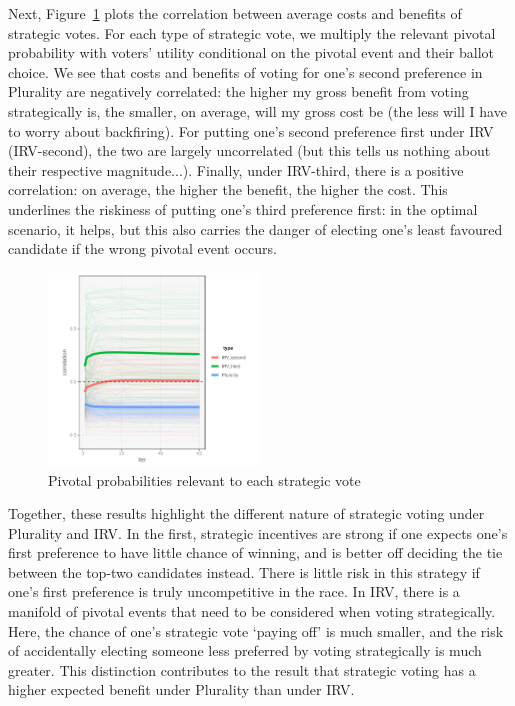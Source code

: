 \documentclass[12pt, letter]{article}
\begin{document}
Next, Figure~\ref{fig:correl} plots the correlation between average costs and benefits of strategic votes. For each type of strategic vote, we multiply the relevant pivotal probability with voters' utility conditional on the pivotal event and their ballot choice. We see that costs and benefits of voting for one's second preference in Plurality are negatively correlated: the higher my gross benefit from voting strategically is, the smaller, on average, will my gross cost be (the less will I have to worry about backfiring). For putting one's second preference first under IRV (IRV-second), the two are largely uncorrelated (but this tells us nothing about their respective magnitude...). Finally, under IRV-third, there is a positive correlation: on average, the higher the benefit, the higher the cost. This underlines the riskiness of putting one's third preference first: in the optimal scenario, it helps, but this also carries the danger of electing one's least favoured candidate if the wrong pivotal event occurs.

\begin{figure}[!htb]
	\centering
	\includegraphics[width = 0.5\textwidth]{../output/figures/conj2}
	\caption{Pivotal probabilities relevant to each strategic vote}
	\label{fig:correl}
\end{figure}

Together, these results highlight the different nature of strategic voting under Plurality and IRV. In the first, strategic incentives are strong if one expects one's first preference to have little chance of winning, and is better off deciding the tie between the top-two candidates instead. There is little risk in this strategy if one's first preference is truly uncompetitive in the race. In IRV, there is a manifold of pivotal events that need to be considered when voting strategically. Here, the chance of one's strategic vote `paying off' is much smaller, and the risk of accidentally electing someone less preferred by voting strategically is much greater. This distinction contributes to the result that strategic voting has a higher expected benefit under Plurality than under IRV.
\end{document}

